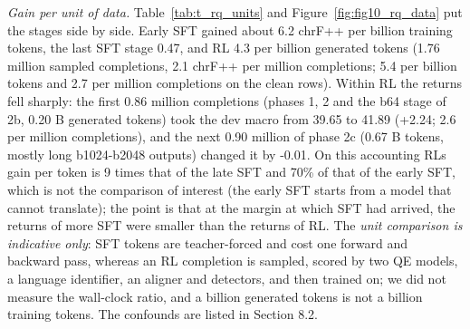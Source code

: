 \emph{Gain per unit of data.} Table~\ref{tab:t_rq_units} and Figure~\ref{fig:fig10_rq_data} put the stages side by side. Early SFT gained about 6.2 chrF++ per billion training tokens, the last SFT stage 0.47, and RL 4.3 per billion generated tokens (1.76 million sampled completions, 2.1 chrF++ per million completions; 5.4 per billion tokens and 2.7 per million completions on the clean rows). Within RL the returns fell sharply: the first 0.86 million completions (phases 1, 2 and the b64 stage of 2b, 0.20 B generated tokens) took the dev macro from 39.65 to 41.89 (+2.24; 2.6 per million completions), and the next 0.90 million of phase 2c (0.67 B tokens, mostly long b1024-b2048 outputs) changed it by -0.01. On this accounting RL\textquotesingle s gain per token is 9 times that of the late SFT and 70\% of that of the early SFT, which is not the comparison of interest (the early SFT starts from a model that cannot translate); the point is that at the margin at which SFT had arrived, the returns of more SFT were smaller than the returns of RL. The \emph{unit comparison is indicative only}: SFT tokens are teacher-forced and cost one forward and backward pass, whereas an RL completion is sampled, scored by two QE models, a language identifier, an aligner and detectors, and then trained on; we did not measure the wall-clock ratio, and a billion generated tokens is not a billion training tokens. The confounds are listed in Section 8.2.


